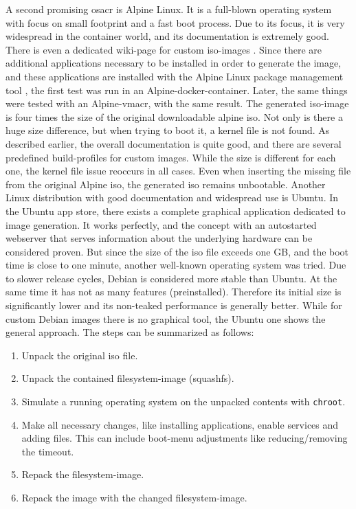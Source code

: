 \newline
A second promising \gls{osacr} is Alpine Linux. It is a full-blown operating system with focus on small footprint and a fast boot process. Due to its focus, it is very widespread in the container world, and its documentation is extremely good. There is even a dedicated wiki-page for custom iso-images \cite{alpine_custom_iso}. Since there are additional applications necessary to be installed in order to generate the image, and these applications are installed with the Alpine Linux package management tool , the first test was run in an Alpine-docker-container. Later, the same things were tested with an Alpine-\gls{vmacr}, with the same result. The generated iso-image is four times the size of the original downloadable alpine iso. Not only is there a huge size difference, but when trying to boot it, a kernel file is not found. As described earlier, the overall documentation is quite good, and there are several predefined build-profiles for custom images. While the size is different for each one, the kernel file issue reoccurs in all cases. Even when inserting the missing file from the original Alpine iso, the generated iso remains unbootable.
\newline
Another Linux distribution with good documentation and widespread use is Ubuntu. In the Ubuntu app store, there exists a complete graphical application dedicated to image generation. It works perfectly, and the concept with an autostarted webserver that serves information about the underlying hardware can be considered proven. But since the size of the iso file exceeds one GB, and the boot time is close to one minute, another well-known operating system was tried.
\newline
Due to slower release cycles, Debian is considered more stable than Ubuntu. At the same time it has not as many features (preinstalled). Therefore its initial size is significantly lower and its non-teaked performance is generally better. While for custom Debian images there is no graphical tool, the Ubuntu one shows the general approach. The steps can be summarized as follows:

\begin{enumerate}
  \item Unpack the original iso file.
  \item Unpack the contained filesystem-image (squashfs).
  \item Simulate a running operating system on the unpacked contents with \texttt{chroot}.
  \item Make all necessary changes, like installing applications, enable services and adding files. This can include boot-menu adjustments like reducing/removing the timeout.
  \item Repack the filesystem-image.
  \item Repack the image with the changed filesystem-image.
\end{enumerate}

